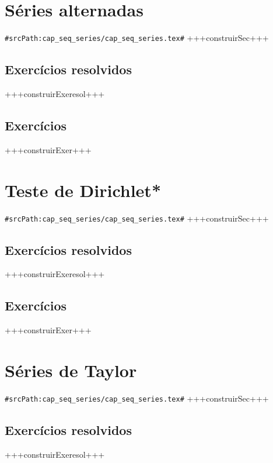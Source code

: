 \section{Séries alternadas}
\verb+#srcPath:cap_seq_series/cap_seq_series.tex#+
+++construirSec+++

\subsection*{Exercícios resolvidos}

+++construirExeresol+++


\subsection*{Exercícios}

+++construirExer+++


\section{Teste de Dirichlet*}
\verb+#srcPath:cap_seq_series/cap_seq_series.tex#+
+++construirSec+++

\subsection*{Exercícios resolvidos}

+++construirExeresol+++


\subsection*{Exercícios}

+++construirExer+++


\section{Séries de Taylor}
\verb+#srcPath:cap_seq_series/cap_seq_series.tex#+
+++construirSec+++

\subsection*{Exercícios resolvidos}

+++construirExeresol+++


